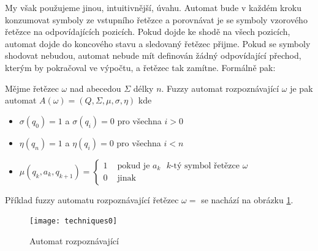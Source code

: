 \documentclass[a4paper,10pt]{article}
\begin{document}
My však použujeme jinou, intuitivnější, úvahu. Automat bude v každém kroku konzumovat symboly ze vstupního řetězce a porovnávat je se symboly vzorového řetězce na odpovídajících pozicích. Pokud dojde ke shodě na všech pozicích, automat dojde do koncového stavu a sledovaný řetězec přijme. Pokud se symboly shodovat nebudou, automat nebude mít definován žádný odpovídající přechod, kterým by pokračoval ve výpočtu, a řetězec tak zamítne. Formálně pak:

\begin{definition} \label{def-FuzzAutRozpOme}
  Mějme řetězec $\omega$ nad abecedou $\Sigma$ délky $n$. Fuzzy automat rozpoznávající $\omega$ je pak automat $A(\omega) = ( Q, \Sigma, \mu, \sigma, \eta )$ kde
  \begin{itemize}
   \item $\sigma(q_0) = 1$ a $\sigma(q_i) = 0$ pro všechna $i > 0$
   \item $\eta(q_n) = 1$ a $\eta(q_i) = 0$ pro všechna $i < n$
   \item $\mu(q_{k}, a_k, q_{k+1}) = 
      \begin{cases}
	1		& \text{ pokud je $a_k$ $k$-tý symbol řetězce $\omega$} \\
	0		& \text{ jinak}
      \end{cases}
      $
  \end{itemize}
\end{definition}

\begin{example}
 Příklad fuzzy automatu rozpoznávající řetězec $\omega = $  se nachází na obrázku \ref{diag-AutRozpHell}.   

  \begin{figure}
    \texttt{[image: techniques0]}
    \caption{Automat rozpoznávající } \label{diag-AutRozpHell} 
  \end{figure}
\end{example}
\end{document}
